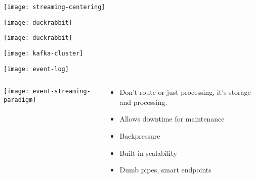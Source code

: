 \documentclass[aspectratio=169, 15pt,usenames,dvipsnames]{beamer}
\begin{document}
\begin{gdsw}
	\centering\texttt{[image: streaming-centering]}\\        
\end{gdsw}
\begin{gdsw}
	\centering\texttt{[image: duckrabbit]}         
	\par
\end{gdsw}
\begin{gdsw}
	\centering\texttt{[image: duckrabbit]}         
	\par
\end{gdsw}
\begin{gdsw}
	\centering\texttt{[image: kafka-cluster]}  
	\par       
\end{gdsw}
\begin{gdsw}
	\centering\texttt{[image: event-log]}  
	\par       
\end{gdsw}
\begin{gdsw}
	\begin{columns}
		\begin{column}{0.4\textwidth}
			\centering\texttt{[image: event-streaming-paradigm]} 
		\end{column}
		\begin{column}{0.6\textwidth}
			\large
			\begin{itemize}
				\item Don't route or just processing, it's storage and processing.
				\pause
				\item Allows downtime for maintenance
				\pause
				\item Backpressure
				\item Built-in scalability
				\item Dumb pipes, smart endpoints
			\end{itemize}	
		\end{column}
	\end{columns}
\end{gdsw}
\end{document}
